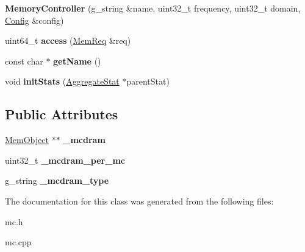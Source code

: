 \begin{DoxyCompactItemize}
\item 
\hypertarget{classMemoryController_a03c7ce9cfcb3c196683b3b4d6850f72b}{{\bfseries Memory\-Controller} (g\-\_\-string \&name, uint32\-\_\-t frequency, uint32\-\_\-t domain, \hyperlink{classConfig}{Config} \&config)}\label{classMemoryController_a03c7ce9cfcb3c196683b3b4d6850f72b}

\item 
\hypertarget{classMemoryController_a76929b5f95037e6084ca9f6faf133c7d}{uint64\-\_\-t {\bfseries access} (\hyperlink{structMemReq}{Mem\-Req} \&req)}\label{classMemoryController_a76929b5f95037e6084ca9f6faf133c7d}

\item 
\hypertarget{classMemoryController_a3b20d9e4110703d74f23180792eba6d7}{const char $\ast$ {\bfseries get\-Name} ()}\label{classMemoryController_a3b20d9e4110703d74f23180792eba6d7}

\item 
\hypertarget{classMemoryController_a73ccd3c50c08fc7d4c1ab1f514477039}{void {\bfseries init\-Stats} (\hyperlink{classAggregateStat}{Aggregate\-Stat} $\ast$parent\-Stat)}\label{classMemoryController_a73ccd3c50c08fc7d4c1ab1f514477039}

\end{DoxyCompactItemize}
\subsection*{Public Attributes}
\begin{DoxyCompactItemize}
\item 
\hypertarget{classMemoryController_a5bb5716a7864317b8d8a8bd7e8870cba}{\hyperlink{classMemObject}{Mem\-Object} $\ast$$\ast$ {\bfseries \-\_\-mcdram}}\label{classMemoryController_a5bb5716a7864317b8d8a8bd7e8870cba}

\item 
\hypertarget{classMemoryController_ac7ac627d709b9607d73e2779fb2ff8f6}{uint32\-\_\-t {\bfseries \-\_\-mcdram\-\_\-per\-\_\-mc}}\label{classMemoryController_ac7ac627d709b9607d73e2779fb2ff8f6}

\item 
\hypertarget{classMemoryController_a7b95a3592aa87c15d25bd2c276a9e5ef}{g\-\_\-string {\bfseries \-\_\-mcdram\-\_\-type}}\label{classMemoryController_a7b95a3592aa87c15d25bd2c276a9e5ef}

\end{DoxyCompactItemize}


The documentation for this class was generated from the following files\-:\begin{DoxyCompactItemize}
\item 
mc.\-h\item 
mc.\-cpp\end{DoxyCompactItemize}
